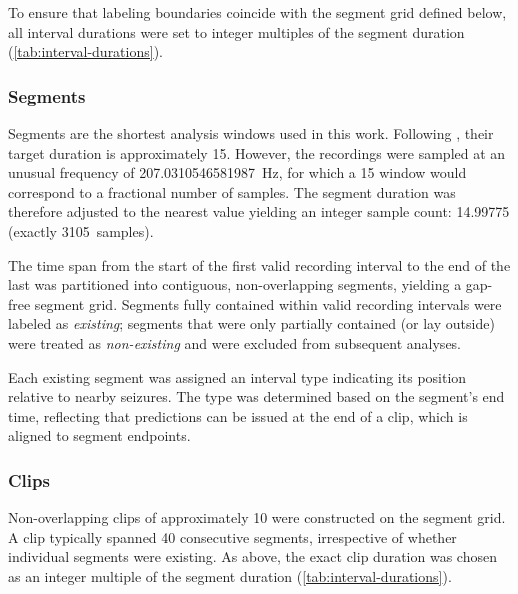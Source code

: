 To ensure that labeling boundaries coincide with the segment grid defined below, all interval durations were set to integer multiples of the segment duration (\cref{tab:interval-durations}).

\begin{table}[!htbp]
    \centering
    \caption[Interval Durations]{The approximate and exact durations of the defined intervals, as multiples of segments.}
    \label{tab:interval-durations}
    
\end{table}

\subsubsection{Segments}
Segments are the shortest analysis windows used in this work. Following \textcite{muller_coherent_2022, yang_seizure_2024}, their target duration is approximately \SI{15}{\sec}.
However, the recordings were sampled at an unusual frequency of \SI{207.0310546581987}{\hertz}, for which a \SI{15}{\sec} window would correspond to a fractional number of samples.
The segment duration was therefore adjusted to the nearest value yielding an integer sample count: \SI{14.99775}{\sec} (exactly \SI{3105}{samples}).

The time span from the start of the first valid recording interval to the end of the last was partitioned into contiguous, non-overlapping segments, yielding a gap-free segment grid.
Segments fully contained within valid recording intervals were labeled as \textit{existing}; segments that were only partially contained (or lay outside) were treated as \textit{non-existing} and were excluded from subsequent analyses.

Each existing segment was assigned an interval type indicating its position relative to nearby seizures.
The type was determined based on the segment's end time, reflecting that predictions can be issued at the end of a clip, which is aligned to segment endpoints.

\subsubsection{Clips}
Non-overlapping clips of approximately \SI{10}{\min} were constructed on the segment grid.
A clip typically spanned 40 consecutive segments, irrespective of whether individual segments were existing.
As above, the exact clip duration was chosen as an integer multiple of the segment duration (\cref{tab:interval-durations}).

